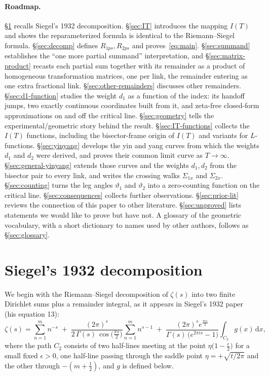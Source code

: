 \documentclass[11pt]{article}
\theoremstyle{definition}
\begin{document}
\paragraph{Roadmap.} \S\ref{sec:siegel} recalls Siegel's 1932 decomposition.
\S\ref{sec:IT} introduces the mapping $I(T)$ and shows the reparameterized
formula is identical to the Riemann--Siegel formula. \S\ref{sec:decomp} defines
$R_{1ps},R_{2ps}$ and proves~\eqref{eq:main}. \S\ref{sec:summand} establishes the
``one more partial summand'' interpretation, and \S\ref{sec:matrix-product}
recasts each partial sum together with its remainder as a product of
homogeneous transformation matrices, one per link, the remainder entering as
one extra fractional link.
\S\ref{sec:other-remainders} discusses other remainders.
\S\ref{sec:d1-function} studies the weight $d_1$ as a function of the index:
its handoff jumps, two exactly continuous coordinates built from it, and
zeta-free closed-form approximations on and off the critical line.
\S\ref{sec:geometry} tells the experimental/geometric story
behind the result. \S\ref{sec:IT-functions} collects the $I(T)$ functions,
including the bisector-frame origin of $I(T)$ and variants for
$L$-functions. \S\ref{sec:yinyang} develops the yin and yang
curves from which the weights $d_1$ and $d_2$ were derived, and proves
their common limit curve as $T\to\infty$.
\S\ref{sec:general-yinyang} extends those curves and the weights $d_1,d_2$
from the bisector pair to every link, and writes the crossing walks
$\Sigma_{1x}$ and $\Sigma_{2x}$.
\S\ref{sec:counting} turns the leg angles $\vartheta_1$ and $\vartheta_2$
into a zero-counting function on the critical line.
\S\ref{sec:consequences} collects further observations.
\S\ref{sec:prior-lit} reviews the connection of this paper to other
literature.
\S\ref{sec:unproved} lists statements we would like to prove but have not.
A glossary of the geometric vocabulary, with a short dictionary to names
used by other authors, follows as \S\ref{sec:glossary}.

\section{Siegel's 1932 decomposition}\label{sec:siegel}

We begin with the Riemann--Siegel decomposition of $\zeta(s)$ into two finite
Dirichlet sums plus a remainder integral, as it appears in Siegel's 1932
paper~\cite{Siegel1932} (his equation 13):
\begin{equation}\label{eq:siegel13}
\zeta(s)
=
\sum_{n=1}^{m} n^{-s}
\;+\;
\frac{(2\pi)^s}{2\,\Gamma(s)\,\cos\!\bigl(\tfrac{\pi s}{2}\bigr)}
\sum_{n=1}^{m} n^{s-1}
\;+\;
\frac{(2\pi)^s e^{\tfrac{\pi i s}{2}}}{\Gamma(s)\,\bigl(e^{2\pi i s}-1\bigr)}
\int_{C_2} g(x)\,\mathrm{d}x,
\end{equation}
where the path $C_2$ consists of two half-lines meeting at the point
$\eta\bigl(1-\tfrac{\epsilon}{2}\bigr)$ for a small fixed $\epsilon>0$, one
half-line passing through the saddle point $\eta=+\sqrt{t/2\pi}$ and the
other through $-(m+\tfrac12)$, and $g$ is defined below.
\end{document}
